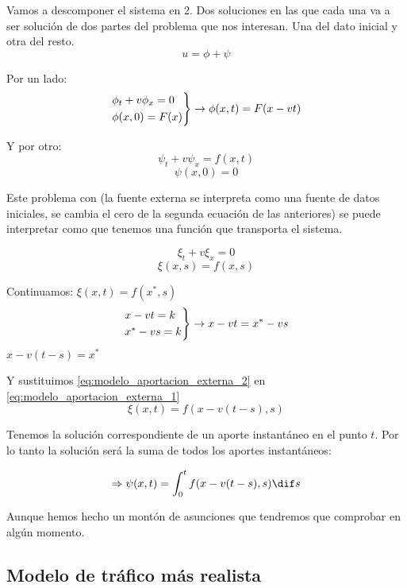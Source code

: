 			Vamos a descomponer el sistema en 2. Dos soluciones en las que cada una va a ser solución de dos partes del problema que nos interesan. Una del dato inicial y otra del resto.
			$$u = \phi + \psi$$

			Por un lado:
			$$
			\begin{rcases}
				\phi_t + v\phi_x = 0 \\
				\phi(x,0) = F(x)
			\end{rcases}
			\rightarrow \phi(x,t) = F(x-vt)
			$$

			Y por otro:
			$$\psi_t + v\psi_x = f(x,t)$$
			$$\psi(x,0) = 0$$

			Este problema con  (la fuente externa se interpreta como una fuente de datos iniciales, se cambia el cero de la segunda ecuación de las anteriores) se puede interpretar como que tenemos una función que transporta el sistema.

			\begin{figure}[hbtp]
				\centering
				\caption{}
				\label{fig:interseccionCaracteristica}
			\end{figure}



			$$\xi_t + v\xi_x = 0$$
			$$\xi(x,s) = f(x,s)$$

			Continuamos:
			\(\xi(x,t) = f(x^*,s) \label{eq:modelo_aportacion_externa_1}\)
			$$
			\begin{rcases}
				x-vt = k \\
				x^* - vs = k
			\end{rcases}
			 \rightarrow x-vt = x^* - vs
			$$
			\( x-v(t-s) = x^{*} \label{eq:modelo_aportacion_externa_2} \)

			Y sustituimos \ref{eq:modelo_aportacion_externa_2} en \ref{eq:modelo_aportacion_externa_1}
			$$\xi(x,t) = f(x - v(t-s), s)$$


			Tenemos la solución correspondiente de un aporte instantáneo en el punto $t$. Por lo tanto la solución será la suma de todos los aportes instantáneos:

			$$\Rightarrow \psi(x,t) = \int^{t}_{0} f(x-v(t-s),s) \dif s $$

			Aunque hemos hecho un montón de asunciones que tendremos que comprobar en algún momento.

	\subsection{Modelo de tráfico más realista}

